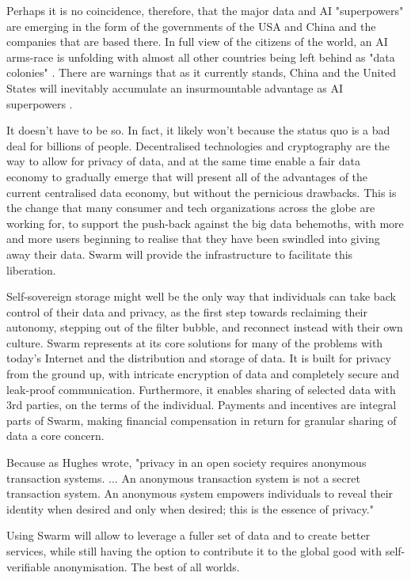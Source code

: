 Perhaps it is no coincidence, therefore, that the major data and AI "superpowers" are emerging in the form of the governments of the USA and China and the companies that are based there. In full view of the citizens of the world, an AI arms-race is unfolding with almost all other countries being left behind as "data colonies" \cite{HarariDavos2020Mar}. There are warnings that as it currently stands, China and the United States will inevitably accumulate an insurmountable advantage as AI superpowers \cite{Lee2018Sep}.

It doesn't have to be so. In fact, it likely won't because the status quo is a bad deal for billions of people. Decentralised technologies and cryptography are the way to allow for privacy of data, and at the same time enable a fair data economy to gradually emerge that will present all of the advantages of the current centralised data economy, but without the pernicious drawbacks. This is the change that many consumer and tech organizations across the globe are working for, to support the push-back against the big data behemoths, with more and more users beginning to realise that they have been swindled into giving away their data. Swarm will provide the infrastructure to facilitate this liberation.

Self-sovereign storage might well be the only way that individuals can take back control of their data and privacy, as the first step towards reclaiming their autonomy, stepping out of the filter bubble, and reconnect instead with their own culture. Swarm represents at its core solutions for many of the problems with today's Internet and the distribution and storage of data. It is built for privacy from the ground up, with intricate encryption of data and completely secure and leak-proof communication. Furthermore, it enables sharing of selected data with 3rd parties, on the terms of the individual. Payments and incentives are integral parts of Swarm, making financial compensation in return for granular sharing of data a core concern.

Because as Hughes wrote, "privacy in an open society requires anonymous transaction systems. ... An anonymous transaction system is not a secret transaction system. An anonymous system empowers individuals to reveal their identity when desired and only when desired; this is the essence of privacy."

Using Swarm will allow to leverage a fuller set of data and to create better services, while still having the option to contribute it to the global good with self-verifiable anonymisation. The best of all worlds.

